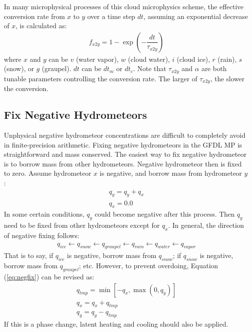 \documentclass[letterpaper,titlepage,10pt]{article}
\numberwithin{equation}{section}
\begin{document}
In many microphysical processes of this cloud microphysics scheme, the effective conversion rate from $x$ to $y$ over a time step $dt$, assuming an exponential decrease of $x$, is calculated as:
\begin{gather}
	f_{x2y} = 1 - \exp \left(-\dfrac{dt}{\tau_{x2y}} \right)
\end{gather}
where $x$ and $y$ can be $v$ (water vapor), $w$ (cloud water), $i$ (cloud ice), $r$ (rain), $s$ (snow), or $g$ (graupel). $dt$ can be $dt_{m}$ or $dt_{c}$. Note that $\tau_{x2y}$ and $\alpha$ are both tunable parameters controlling the conversion rate. The larger of $\tau_{x2y}$, the slower the conversion. 


\subsection{Fix Negative Hydrometeors}

Unphysical negative hydrometeor concentrations are difficult to completely avoid in finite-precision arithmetic. Fixing negative hydrometeors in the GFDL MP is straightforward and mass conserved. The easiest way to fix negative hydrometeor is to borrow mass from other hydrometeors. Negative hydrometeor then is fixed to zero. Assume hydrometeor $x$ is negative, and borrow mass from hydrometeor $y$:
\begin{gather} \label{eq:negfix}
	q_y = q_y + q_x \\
	q_x = 0.0
\end{gather}
In some certain conditions, $q_y$ could become negative after this process. Then $q_y$ need to be fixed from other hydrometeors except for $q_x$. In general, the direction of negative fixing follows:
\begin{gather}
	q_{ice} \leftarrow q_{snow} \leftarrow q_{graupel} \leftarrow q_{rain} \leftarrow q_{water} \leftarrow q_{vapor}
\end{gather}
That is to say, if $q_{ice}$ is negative, borrow mass from $q_{snow}$; if $q_{snow}$ is negative, borrow mass from $q_{graupel}$; etc. However, to prevent overdoing, Equation (\ref{eq:negfix}) can be revised as:
\begin{gather}
	q_{tmp} = \min \left[ - q_x, \max \left(0, q_y \right) \right] \\
	q_x = q_x + q_{tmp} \\
	q_y = q_y - q_{tmp}
\end{gather}
If this is a phase change, latent heating and cooling should also be applied.
\end{document}
